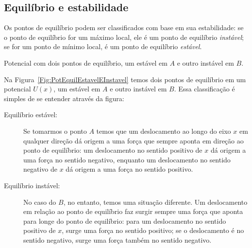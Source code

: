 \subsection{Equilíbrio e estabilidade}

Os pontos de equilíbrio podem ser classificados com base em sua estabilidade: se o ponto de equilíbrio for um máximo local, ele é um ponto de equilíbrio \emph{instável}; se for um ponto de mínimo local, é um ponto de equilíbrio \emph{estável}.

\begin{marginfigure}[2cm]
\centering
{}
\caption{Potencial com dois pontos de equilíbrio, um estável em $A$ e outro instável em $B$. \label{Fig:PotEquilEstavelEInstavel}}
\end{marginfigure}

Na Figura~\ref{Fig:PotEquilEstavelEInstavel} temos dois pontos de equilíbrio em um potencial $U(x)$, um estável em $A$ e outro instável em $B$. Essa classificação é simples de se entender através da figura:
\begin{description}
    \item[Equilíbrio estável:] Se tomarmos o ponto $A$ temos que um deslocamento ao longo do eixo $x$ em qualquer direção dá origem a uma força que sempre aponta em direção ao ponto de equilíbrio: um deslocamento no sentido positivo de $x$ dá origem a uma força no sentido negativo, enquanto um deslocamento no sentido negativo de $x$ dá origem a uma força no sentido positivo.

    \item[Equilíbrio instável:] No caso do $B$, no entanto, temos uma situação diferente. Um deslocamento em relação ao ponto de equilíbrio faz surgir sempre uma força que aponta para longe do ponto de equilíbrio: para um deslocamento no sentido positivo de $x$, surge uma força no sentido positivo; se o deslocamento é no sentido negativo, surge uma força também no sentido negativo.
\end{description}

